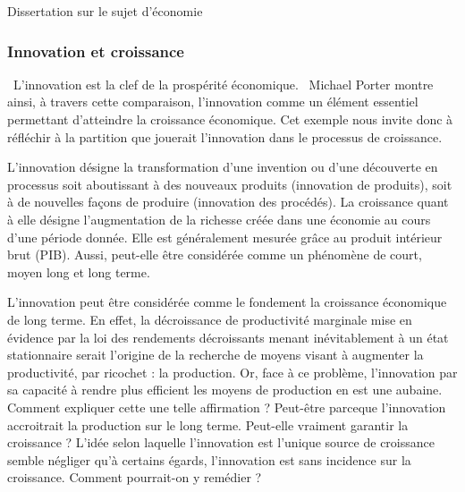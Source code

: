 \newpage 
	\begin{bclogo}[barre=none,logo={}]{Dissertation sur le sujet d'économie}
		\begin{center}
		\subsubsection*{Innovation et croissance}
		\end{center}
	\end{bclogo}
	

	\hspace*{.5cm}\guillemetleft\ L'innovation est la clef de la prospérité économique. \guillemetright\ Michael Porter montre ainsi, à travers cette comparaison, l’innovation comme un élément essentiel permettant d’atteindre la croissance économique. Cet exemple nous invite donc à réfléchir à la partition que jouerait l’innovation dans le processus de croissance.
	
	\hspace*{.5cm}L'innovation désigne la transformation d’une invention ou d’une découverte en processus soit aboutissant à des nouveaux produits (innovation de produits), soit à de nouvelles façons de produire (innovation des procédés). La croissance quant à elle désigne l’augmentation de la richesse créée dans une économie au cours d’une période donnée. Elle est généralement mesurée grâce au produit intérieur brut (PIB). Aussi, peut-elle être considérée comme un phénomène de court, moyen long et long terme.
	
	\hspace*{.5cm}L'innovation peut être considérée comme le fondement la croissance économique de long terme. En effet, la décroissance de productivité marginale mise en évidence par la loi des rendements décroissants menant inévitablement à un état stationnaire serait l'origine de la recherche de moyens visant à augmenter la productivité, par ricochet : la production. Or, face à ce problème, l'innovation par sa capacité à rendre plus efficient les moyens de production en est une aubaine. Comment expliquer cette une telle affirmation ? Peut-être parceque l'innovation accroitrait la production sur le long terme. Peut-elle vraiment garantir la croissance ? L'idée selon laquelle l'innovation est l'unique source de croissance semble négliger qu'à certains égards, l'innovation est sans incidence sur la croissance. Comment pourrait-on y remédier ?
	
